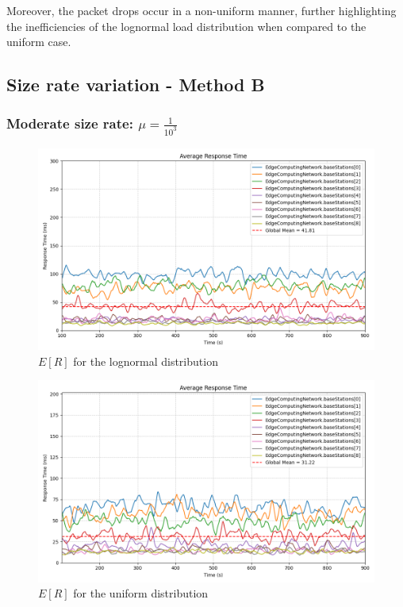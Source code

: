 \documentclass{report}
\begin{document}
\begin{flushleft}
Moreover, the packet drops occur in a non-uniform manner, further highlighting the inefficiencies of the lognormal load distribution when compared to the uniform case.
\end{flushleft}

\subsection{Size rate variation - Method B}
\subsubsection*{Moderate size rate: $\mu=\frac{1}{10^3}$}

\begin{figure}[H]
    \centering
    \includegraphics[width=\textwidth]{img/plots/log_1e3_B/resptime.png}
    \caption{$E[R]$ for the lognormal distribution}
\end{figure}

\begin{figure}[H]
    \centering
    \includegraphics[width=\textwidth]{img/plots/uni_1e3_B/resptime.png}
    \caption{$E[R]$ for the uniform distribution}
\end{figure}
\end{document}
